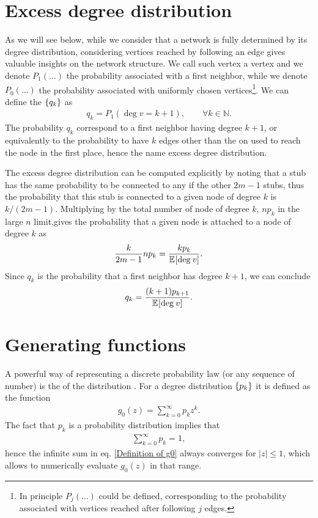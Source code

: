 \documentclass[
11pt, %
english, %
singlespacing, %
nolistspacing, %
liststotoc, %
headsepline, %
]{MastersDoctoralThesis} %
\begin{document}
\section{Excess degree distribution}

As we will see below, while we consider that a network is fully determined by its degree distribution, considering vertices reached by following an edge gives valuable insights on the network structure. We call such vertex a  vertex and we denote $P_1(\dots)$ the probability associated with a first neighbor, while we denote $P_0(\dots)$ the probability associated with uniformly chosen vertices\footnote{In principle $P_j(\dots)$ could be defined, corresponding to the probability associated with vertices reached after following $j$ edges.}. We can define the  $\{q_k\}$ as
\begin{align}
	q_k = P_1(\deg{v} = k + 1), \qquad \forall k \in \mathbb{N}.
\end{align}
The probability $q_k$ correspond to a first neighbor having degree $k + 1$, or equivalently to the probability to have $k$ edges other than the on used to reach the node in the first place, hence the name excess degree distribution.

The excess degree distribution can be computed explicitly by noting that a stub has the same probability to be connected to any if the other $2 m - 1$ stubs, thus the probability that this stub is connected to a given node of degree $k$ is $k/(2 m - 1)$. Multiplying by the total number of node of degree $k$, $n p_k$ in the large $n$ limit,gives the probability that a given node is attached to a node of degree $k$ as
\begin{align}
	\frac{k}{2 m -1} n p_k = \frac{k p_k}{\mathbb{E}_{}\!\left[ \mathrm{deg}_{}\, v \right]}.
\end{align}
Since $q_k$ is the probability that a first neighbor has degree $k + 1$, we can conclude
\begin{align}
	q_k = \frac{(k + 1) p_{k+1}}{\mathbb{E}_{}\!\left[ \mathrm{deg}_{}\, v \right]}. \label{qk as function of pk}
\end{align}

\section{Generating functions}
\label{Section: Generating functions}

A powerful way of representing a discrete probability law (or any sequence of number) is the  of the distribution \cite{wilf2005generatingfunctionology}. For a degree distribution $\{p_k\}$ it is defined as the function
\begin{align}
	g_0(z) = \sum_{k=0}^\infty p_k z^k. \label{Definition of g0}
\end{align}
The fact that $p_k$ is a probability distribution implies that
\begin{align}
	\sum_{k = 0}^\infty p_k = 1, \label{Normalization of pk}
\end{align}
hence the infinite sum in eq. \eqref{Definition of g0} always converges for $\rvert z \rvert \leq 1$, which allows to numerically evaluate $g_0(z)$ in that range.
\end{document}
